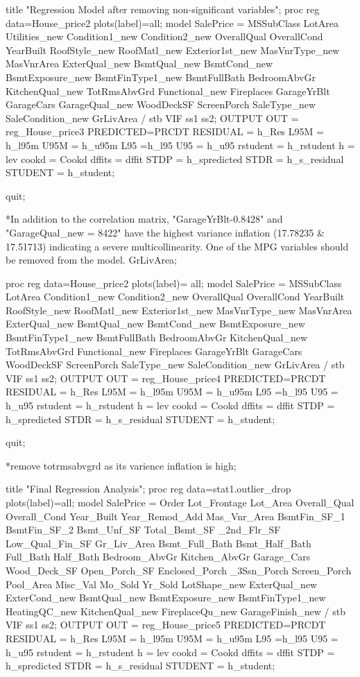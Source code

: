 title "Regression Model after removing non-significant variables";
proc reg data=House_price2
plots(label)=all;
	model 	SalePrice =		
			MSSubClass		LotArea		Utilities_new	 Condition1_new	Condition2_new		
			OverallQual		OverallCond		YearBuilt	RoofStyle_new	RoofMatl_new	Exterior1st_new								
			MasVnrType_new	MasVnrArea		ExterQual_new	BsmtQual_new
			BsmtCond_new	BsmtExposure_new BsmtFinType1_new 		BsmtFullBath
			BedroomAbvGr	KitchenQual_new	TotRmsAbvGrd	Functional_new	Fireplaces			
			GarageYrBlt		GarageCars		GarageQual_new	WoodDeckSF			
			ScreenPorch		SaleType_new	SaleCondition_new	GrLivArea
	/   stb     VIF ss1 ss2;
	OUTPUT OUT = reg_House_price3 PREDICTED=PRCDT RESIDUAL = h_Res
	L95M = h_l95m U95M  = h_u95m L95 =h_l95 U95 = h_u95 
	rstudent = h_rstudent h = lev cookd = Cookd dffits = dffit 
	STDP = h_spredicted STDR = h_s_residual STUDENT = h_student;
      
quit;

*In addition to the correlation matrix,  "GarageYrBlt-0.8428" and "GarageQual_new = 8422" have the highest variance inflation (17.78235 & 17.51713) indicating a severe multicollinearity. 
One of the MPG variables should be removed from the model. GrLivArea;

proc reg data=House_price2
plots(label)= all;
	model 	SalePrice =		MSSubClass		LotArea		Condition1_new	Condition2_new		
			OverallQual		OverallCond		YearBuilt	RoofStyle_new	RoofMatl_new	Exterior1st_new								
			MasVnrType_new	MasVnrArea		ExterQual_new	BsmtQual_new
			BsmtCond_new	BsmtExposure_new BsmtFinType1_new 	BsmtFullBath
			BedroomAbvGr	KitchenQual_new	TotRmsAbvGrd	Functional_new	Fireplaces			
			GarageYrBlt		GarageCars		WoodDeckSF	ScreenPorch		SaleType_new	
			SaleCondition_new	GrLivArea
			 /   stb     VIF ss1 ss2;
	OUTPUT OUT = reg_House_price4 PREDICTED=PRCDT RESIDUAL = h_Res
	L95M = h_l95m U95M  = h_u95m L95 =h_l95 U95 = h_u95 
	rstudent = h_rstudent h = lev cookd = Cookd dffits = dffit 
	STDP = h_spredicted STDR = h_s_residual STUDENT = h_student;
      
quit;

*remove totrmsabvgrd as its varience inflation is high;

title "Final Regression Analysis";
proc reg data=stat1.outlier_drop
plots(label)=all;
	model 	SalePrice =		Order Lot_Frontage Lot_Area Overall_Qual Overall_Cond Year_Built 
		Year_Remod_Add Mas_Vnr_Area BsmtFin_SF_1 BsmtFin_SF_2 Bsmt_Unf_SF 
		Total_Bsmt_SF _2nd_Flr_SF Low_Qual_Fin_SF Gr_Liv_Area Bsmt_Full_Bath 
		Bsmt_Half_Bath Full_Bath Half_Bath Bedroom_AbvGr Kitchen_AbvGr Garage_Cars 
		Wood_Deck_SF Open_Porch_SF Enclosed_Porch _3Ssn_Porch Screen_Porch Pool_Area 
		Misc_Val Mo_Sold Yr_Sold LotShape_new ExterQual_new ExterCond_new 
		BsmtQual_new BsmtExposure_new BsmtFinType1_new HeatingQC_new KitchenQual_new 
		FireplaceQu_new GarageFinish_new	
			 /   stb     VIF ss1 ss2;
	OUTPUT OUT = reg_House_price5 PREDICTED=PRCDT RESIDUAL = h_Res
	L95M = h_l95m U95M  = h_u95m L95 =h_l95 U95 = h_u95 
	rstudent = h_rstudent h = lev cookd = Cookd dffits = dffit 
	STDP = h_spredicted STDR = h_s_residual STUDENT = h_student;
      
